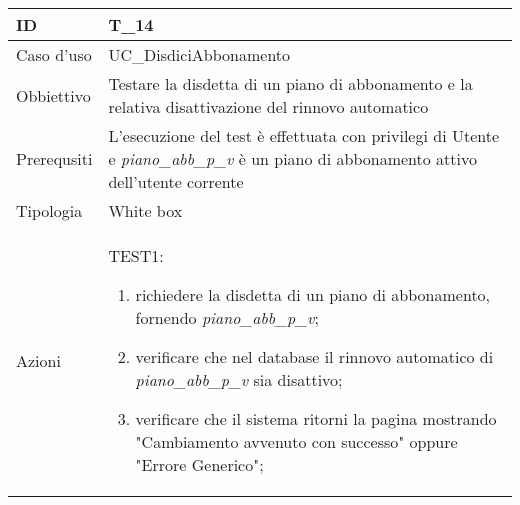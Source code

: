 \begin{table}[hb]
    \centering
    \begin{tabular}{ |p{2cm}|p{10cm}|  }
        \hline
        ID          & T\_14                                                                                                                                   \\\hline
        Caso d'uso  & UC\_DisdiciAbbonamento                                                                                                                  \\\hline
        Obbiettivo  & Testare la disdetta di un piano di abbonamento e la relativa disattivazione del rinnovo automatico                                      \\\hline
        Prerequsiti & L'esecuzione del test è effettuata con privilegi di Utente e \emph{piano\_abb\_p\_v} è un piano di abbonamento attivo dell'utente corrente \\\hline
        Tipologia   & White box                                                                                                                               \\\hline
        Azioni      &
        TEST1:
        \begin{enumerate}[nosep, topsep=0pt]
            \item richiedere la disdetta di un piano di abbonamento, fornendo \emph{piano\_abb\_p\_v};
            \item verificare che nel database il rinnovo automatico di \emph{piano\_abb\_p\_v} sia disattivo;
            \item verificare che il sistema ritorni la pagina mostrando "Cambiamento avvenuto con successo" oppure "Errore Generico";
        \end{enumerate}
        \\\hline
    \end{tabular}
\end{table}

